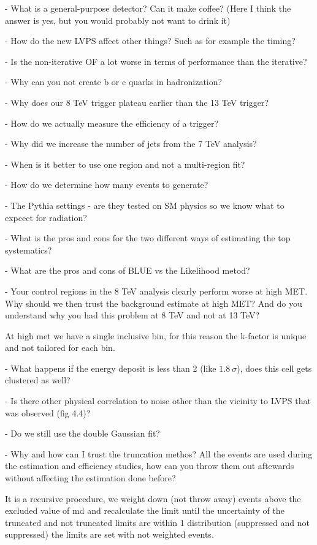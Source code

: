 \documentclass[a4paper,10pt,twoside,notitlepage]{article}
\begin{document}
\begin{description}
  - What is a general-purpose detector? Can it make coffee? (Here I think the
  answer is yes, but you would probably not want to drink it)

  - How do the new LVPS affect other things? Such as for example the timing?

  - Is the non-iterative OF a lot worse in terms of performance than the
  iterative?

  - Why can you not create b or c quarks in hadronization?

  - Why does our 8 TeV trigger plateau earlier than the 13 TeV trigger?

  - How do we actually measure the efficiency of a trigger?

  - Why did we increase the number of jets from the 7 TeV analysis?

  - When is it better to use one region and not a multi-region fit?

  - How do we determine how many events to generate?

  - The Pythia settings - are they tested on SM physics so we know what to
  expcect for radiation?

  - What is the pros and cons for the two different ways of estimating the top
  systematics?

  - What are the pros and cons of BLUE vs the Likelihood metod?

  - Your control regions in the 8 TeV analysis clearly perform worse at high
  MET. Why should we then trust the background estimate at high MET? And do you
  understand why you had this problem at 8 TeV and not at 13 TeV?

  At high met we have a single inclusive bin, for this reason the k-factor is
  unique and not tailored for each bin.


  - What happens if the energy deposit is less than 2 (like $1.8~\sigma$), does
  this cell gets clustered as well?

  - Is there other physical correlation to noise other than the vicinity to LVPS
  that was observed (fig 4.4)?

  - Do we still use the double Gaussian fit?

  - Why and how can I trust the truncation methos? All the events are used
  during the estimation and efficiency studies, how can you throw them out
  aftewards without affecting the estimation done before?

  It is a recursive procedure, we weight down (not throw away) events above the
  excluded value of md and recalculate the limit until the uncertainty of the
  truncated and not truncated limits are within 1%
  distribution (suppressed and not suppressed) the limits are set with not
  weighted events.


\end{description}
\end{document}
